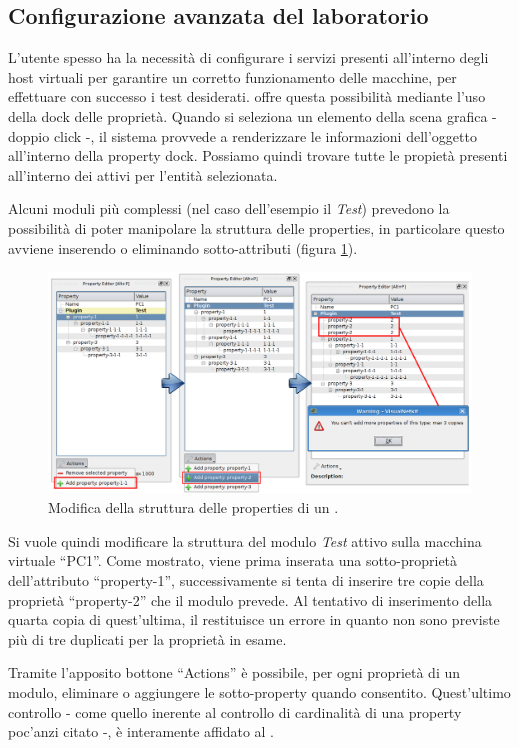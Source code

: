 \subsection{Configurazione avanzata del laboratorio}
L'utente spesso ha la necessità di configurare i servizi presenti all'interno degli host virtuali per garantire un corretto funzionamento delle macchine, per effettuare con successo i test desiderati. \visualnetkit{} offre questa possibilità mediante l'uso della dock delle proprietà.
Quando si seleziona un elemento della scena grafica - doppio click -, il sistema provvede a renderizzare le informazioni dell'oggetto all'interno della property dock. Possiamo quindi trovare tutte le propietà presenti all'interno dei \plugin{} attivi per l'entità selezionata.

Alcuni moduli più complessi (nel caso dell'esempio il \plugin{} \emph{Test}) prevedono la possibilità di poter manipolare la struttura delle properties, in particolare questo avviene inserendo o eliminando sotto-attributi (figura \ref{figura:vn_ex_pp}).

\begin{figure}[!htb]
	\centering
	\includegraphics[width=13cm]{images/vnetkit_property_evolution.png}
	\caption{Modifica della struttura delle properties di un \plugin{}.}
	\label{figura:vn_ex_pp}
\end{figure}
Si vuole quindi modificare la struttura del modulo \emph{Test} attivo sulla macchina virtuale ``PC1''. Come mostrato, viene prima inserata una sotto-proprietà dell'attributo ``property-1'', successivamente si tenta di inserire tre copie della proprietà ``property-2'' che il modulo prevede.
Al tentativo di inserimento della quarta copia di quest'ultima, il \plugin{} restituisce un errore in quanto non sono previste più di tre duplicati per la proprietà in esame.

Tramite l'apposito bottone ``Actions'' è possibile, per ogni proprietà di un modulo, eliminare o aggiungere le sotto-property quando consentito. Quest'ultimo controllo - come quello inerente al controllo di cardinalità di una property poc'anzi citato -, è interamente affidato al \plugin{}.

